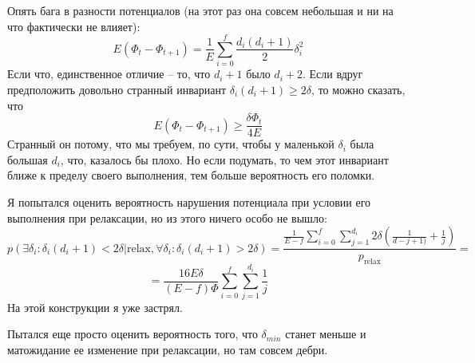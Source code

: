 \documentclass[a4paper]{article}
\begin{document}
 
  Опять бага в разности потенциалов (на этот раз она совсем небольшая и ни на что фактически не влияет):
  $$E(\Phi_t - \Phi_{t + 1}) = \frac{1}{E} \sum_{i = 0}^f \frac{d_i(d_i+1)}{2} \delta_i^2$$
  Если что, единственное отличие -- то, что $d_i + 1$ было $d_i + 2$.
  Если вдруг предположить довольно странный инвариант $\delta_i (d_i + 1) \ge 2\delta$, то можно сказать, что 
  $$E(\Phi_t - \Phi_{t + 1}) \ge \frac{\delta \Phi_t}{4E}$$
  Странный он потому, что мы требуем, по сути, чтобы у маленькой $\delta_i$ была большая $d_i$, что, казалось бы плохо. Но если подумать, то чем этот инвариант ближе к пределу своего выполнения, тем больше вероятность его поломки.
  
  Я попытался оценить вероятность нарушения потенциала при условии его выполнения при релаксации, но из этого ничего особо не вышло:
  $$p(\exists \delta_i: \delta_i(d_i + 1) < 2\delta | \text{relax}, \forall \delta_i: \delta_i(d_i + 1) > 2\delta) = \frac{\frac{1}{E - f}\sum_{i = 0}^{f}\sum_{j = 1}^{d_i} 2\delta\left(\frac{1}{d - j + 1)} + \frac{1}{j} \right)}{p_{\text{relax}}} = $$
  $$ = \frac{16E\delta}{(E - f)\Phi}\sum_{i = 0}^f \sum_{j = 1}^{d_i} \frac{1}{j}$$
  На этой конструкции я уже застрял.
  
  Пытался еще просто оценить вероятность того, что $\delta_{min}$ станет меньше и матожидание ее изменение при релаксации, но там совсем дебри.
 
\end{document}
